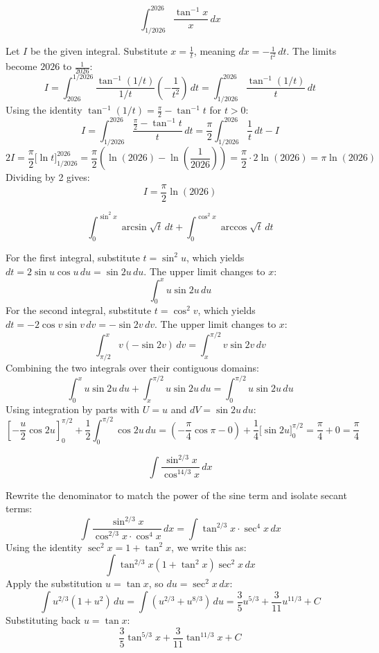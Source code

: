 \begin{questions}
\question
\[ \int_{1/2026}^{2026} \frac{\tan^{-1} x}{x} \,dx \]
\begin{solution}
Let $I$ be the given integral. Substitute $x = \frac{1}{t}$, meaning $dx = -\frac{1}{t^2} \,dt$. The limits become $2026$ to $\frac{1}{2026}$:
\[ I = \int_{2026}^{1/2026} \frac{\tan^{-1}(1/t)}{1/t} \left(-\frac{1}{t^2}\right) \,dt = \int_{1/2026}^{2026} \frac{\tan^{-1}(1/t)}{t} \,dt \]
Using the identity $\tan^{-1}(1/t) = \frac{\pi}{2} - \tan^{-1} t$ for $t > 0$:
\[ I = \int_{1/2026}^{2026} \frac{\frac{\pi}{2} - \tan^{-1} t}{t} \,dt = \frac{\pi}{2} \int_{1/2026}^{2026} \frac{1}{t} \,dt - I \]
\[ 2I = \frac{\pi}{2} \Big[ \ln t \Big]_{1/2026}^{2026} = \frac{\pi}{2} \left( \ln(2026) - \ln\left(\frac{1}{2026}\right) \right) = \frac{\pi}{2} \cdot 2\ln(2026) = \pi \ln(2026) \]
Dividing by 2 gives:
\[ I = \frac{\pi}{2} \ln(2026) \]
\end{solution}

\question
\[ \int_{0}^{\sin^2 x} \arcsin \sqrt{t} \,dt + \int_{0}^{\cos^2 x} \arccos \sqrt{t} \,dt \]
\begin{solution}
For the first integral, substitute $t = \sin^2 u$, which yields $dt = 2 \sin u \cos u \,du = \sin 2u \,du$. The upper limit changes to $x$:
\[ \int_{0}^{x} u \sin 2u \,du \]
For the second integral, substitute $t = \cos^2 v$, which yields $dt = -2 \cos v \sin v \,dv = -\sin 2v \,dv$. The upper limit changes to $x$:
\[ \int_{\pi/2}^{x} v (-\sin 2v) \,dv = \int_{x}^{\pi/2} v \sin 2v \,dv \]
Combining the two integrals over their contiguous domains:
\[ \int_{0}^{x} u \sin 2u \,du + \int_{x}^{\pi/2} u \sin 2u \,du = \int_{0}^{\pi/2} u \sin 2u \,du \]
Using integration by parts with $U = u$ and $dV = \sin 2u \,du$:
\[ \left[ -\frac{u}{2} \cos 2u \right]_{0}^{\pi/2} + \frac{1}{2} \int_{0}^{\pi/2} \cos 2u \,du = \left( -\frac{\pi}{4}\cos\pi - 0 \right) + \frac{1}{4} \Big[ \sin 2u \Big]_{0}^{\pi/2} = \frac{\pi}{4} + 0 = \frac{\pi}{4} \]
\end{solution}

\question
\[ \int \frac{\sin^{2/3} x}{\cos^{14/3} x} \,dx \]
\begin{solution}
Rewrite the denominator to match the power of the sine term and isolate secant terms:
\[ \int \frac{\sin^{2/3} x}{\cos^{2/3} x \cdot \cos^4 x} \,dx = \int \tan^{2/3} x \cdot \sec^4 x \,dx \]
Using the identity $\sec^2 x = 1 + \tan^2 x$, we write this as:
\[ \int \tan^{2/3} x (1 + \tan^2 x) \sec^2 x \,dx \]
Apply the substitution $u = \tan x$, so $du = \sec^2 x \,dx$:
\[ \int u^{2/3}(1 + u^2) \,du = \int (u^{2/3} + u^{8/3}) \,du = \frac{3}{5}u^{5/3} + \frac{3}{11}u^{11/3} + C \]
Substituting back $u = \tan x$:
\[ \frac{3}{5} \tan^{5/3} x + \frac{3}{11} \tan^{11/3} x + C \]
\end{solution}


\end{questions}
